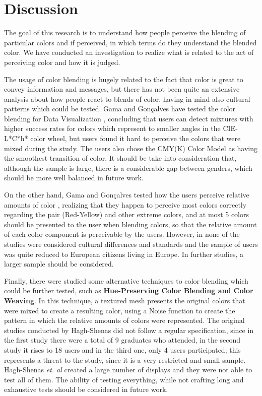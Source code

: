 \documentclass{report}
\begin{document}
\section{Discussion}
\label{discussion}
The goal of this research is to understand how people perceive the blending of particular colors and if perceived,
in which terms do they understand the blended color. We have conducted an investigation to realize what is related to
the act of perceiving color and how it is judged.  \par
The usage of color blending is hugely related to the fact that color is great to convey information and messages,
but there has not been quite an extensive analysis about how people react to blends of color, having in mind also
cultural patterns which could be tested. Gama and Gonçalves have tested the color blending for Data Visualization \cite{Gama20141},
concluding that users can detect mixtures with higher success rates for colors which represent to smaller angles
in the CIE-L*C*h* color wheel, but users found it hard to perceive the colors that were mixed during the study.
The users also chose the CMY(K) Color Model as having the smoothest transition of color. It should be take into
consideration that, although the sample is large, there is a considerable gap between genders, which should be 
more well balanced in future work. \par
On the other hand, Gama and Gonçalves tested how the users perceive relative amounts of color \cite{Gama20142}, realizing that they happen to perceive most
colors correctly regarding the pair (Red-Yellow) and other extreme colors, and at most 5 colors should be presented
to the user when blending colors, so that the relative amount of each color component is perceivable by the users.
However, in none of the studies were considered cultural differences and standards and the sample of users was
quite reduced to European citizens living in Europe. In further studies, a larger sample should be
considered. \par
Finally, there were studied some alternative techniques to color blending which could be further tested, such
as \textbf{Hue-Preserving Color Blending and Color Weaving}. In this technique, a textured mesh presents the original
colors that were mixed to create a resulting color, using a Noise function to create the pattern in which the
relative amounts of colors were represented. The original studies conducted by Hagh-Shenas \cite{Hagh-Shenas2007} did not follow a
regular specification,
since in the first study there were a total of 9 graduates who attended, in the second study it rises to 18 
users and in the third one, only 4 users participated; this represents a threat to the study, since it is a 
very restricted and small sample. Hagh-Shenas \emph{et. al} created a large number of displays and they were not able
to test all of them. The ability of testing everything, while not crafting long and exhaustive tests should be
considered in future work.  
\end{document}
